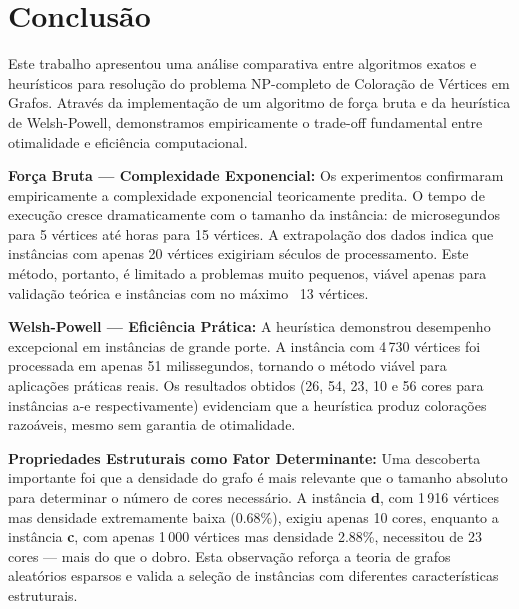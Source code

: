 \documentclass[12pt]{article}
\begin{document}
\newpage
\section{Conclusão}

Este trabalho apresentou uma análise comparativa entre algoritmos exatos e heurísticos para resolução do problema NP-completo de Coloração de Vértices em Grafos. Através da implementação de um algoritmo de força bruta e da heurística de Welsh-Powell, demonstramos empiricamente o trade-off fundamental entre otimalidade e eficiência computacional.

\vspace{0.3cm}

\textbf{Força Bruta — Complexidade Exponencial:} Os experimentos confirmaram empiricamente a complexidade exponencial teoricamente predita. O tempo de execução cresce dramaticamente com o tamanho da instância: de microsegundos para 5 vértices até horas para 15 vértices. A extrapolação dos dados indica que instâncias com apenas 20 vértices exigiriam séculos de processamento. Este método, portanto, é limitado a problemas muito pequenos, viável apenas para validação teórica e instâncias com no máximo ~13 vértices.

\vspace{0.3cm}

\textbf{Welsh-Powell — Eficiência Prática:} A heurística demonstrou desempenho excepcional em instâncias de grande porte. A instância com 4\,730 vértices foi processada em apenas 51 milissegundos, tornando o método viável para aplicações práticas reais. Os resultados obtidos (26, 54, 23, 10 e 56 cores para instâncias a-e respectivamente) evidenciam que a heurística produz colorações razoáveis, mesmo sem garantia de otimalidade.

\vspace{0.3cm}

\textbf{Propriedades Estruturais como Fator Determinante:} Uma descoberta importante foi que a densidade do grafo é mais relevante que o tamanho absoluto para determinar o número de cores necessário. A instância \textbf{d}, com 1\,916 vértices mas densidade extremamente baixa (0.68\%), exigiu apenas 10 cores, enquanto a instância \textbf{c}, com apenas 1\,000 vértices mas densidade 2.88\%, necessitou de 23 cores — mais do que o dobro. Esta observação reforça a teoria de grafos aleatórios esparsos e valida a seleção de instâncias com diferentes características estruturais.
\end{document}

